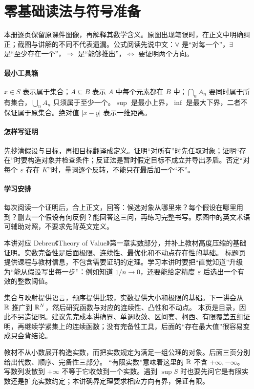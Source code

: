 \section*{零基础读法与符号准备}
本册逐页保留原课件图像，再解释其数学含义。原图出现笔误时，在正文中明确纠正；截图与讲解的不同不代表遗漏。公式阅读先说中文：$\forall$ 是“对每一个”，$\exists$ 是“至少存在一个”，$\Rightarrow$ 是“能够推出”，$\Leftrightarrow$ 要证明两个方向。

\paragraph{最小工具箱}$x\in S$ 表示属于集合；$A\subseteq B$ 表示 $A$ 中每个元素都在 $B$ 中；$\bigcap_n A_n$ 要同时属于所有集合，$\bigcup_n A_n$ 只须属于至少一个。$\sup$ 是最小上界，$\inf$ 是最大下界，二者不保证属于原集合。绝对值 $|x-y|$ 表示一维距离。

\paragraph{怎样写证明}先抄清假设与目标，再把目标翻译成定义。证明“对所有”时先任取对象；证明“存在”时要构造对象并检查条件；反证法是暂时假定目标不成立并导出矛盾。否定“对每个 $\varepsilon$ 存在 $K$”时，量词逐个反转，不能只在最后加一个“不”。

\paragraph{学习安排}每次阅读一个证明后，合上正文，回答：候选对象从哪里来？每个假设在哪里用到？删去一个假设有何反例？能回答这三问，再练习完整书写。原图中的英文术语可辅助对照，不要求先背英文定义。


本讲对应 Debreu《Theory of Value》第一章实数部分，并补上教材高度压缩的基础证明。实数完备性是后面极限、连续性、最优化和不动点存在性的基础。
标题页提供课程与教材信息，不包含需要证明的定理。学习本讲时要把“直觉知道”升级为“能从假设写出每一步”：例如知道 $1/n\to0$，还要能给定精度 $\varepsilon$ 后选出一个有效的整数阈值。

集合与映射提供语言，预序提供比较，实数提供大小和极限的基础。下一讲会从 $\mathbb{R}$ 推广到 $\mathbb{R}^N$，然后研究函数与对应的连续性、凸性和不动点。
本页是目录，因此不另造证明。建议先完成本讲确界、单调收敛、区间套、柯西、有限覆盖五组证明，再继续学紧集上的连续函数；没有完备性工具，后面的“存在最大值”很容易变成只会背结论。

教材不从小数展开构造实数，而把实数规定为满足一组公理的对象。后面三页分别给出代数、顺序、完备性三部分。
“有限实数”意味着这里的 $\mathbb{R}$ 不含 $+\infty,-\infty$。写数列发散到 $+\infty$ 不等于它收敛到一个实数。遇到 $\sup S$ 时也要先问它是有限实数还是扩充实数约定；本讲确界定理要求相应方向有界，保证有限。

